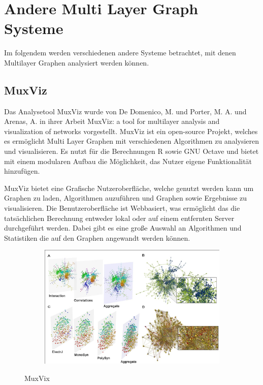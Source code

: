 \section{Andere Multi Layer Graph Systeme}

Im folgendem werden verschiedenen andere Systeme betrachtet, mit denen Multilayer Graphen analysiert werden können.

\subsection{MuxViz}

Das Analysetool MuxViz wurde von De Domenico, M. und Porter, M. A. und Arenas, A. in ihrer Arbeit MuxViz: a tool for multilayer analysis and visualization of networks vorgestellt.
MuxViz ist ein open-source Projekt, welches es ermöglicht Multi Layer Graphen mit verschiedenen Algorithmen zu analysieren und visualisieren. Es nutzt für die Berechnungen R sowie GNU Octave und bietet mit einem modularen Aufbau die Möglichkeit, das Nutzer eigene Funktionalität hinzufügen.


MuxViz bietet eine Grafische Nutzeroberfläche, welche genutzt werden kann um Graphen zu laden, Algorithmen auzuführen und Graphen sowie Ergebnisse zu visualisieren. Die Benutzeroberfläche ist Webbasiert, was ermöglicht das die tatsächlichen Berechnung entweder lokal oder auf einem entfernten Server durchgeführt werden.
Dabei gibt es eine große Auswahl an Algorithmen und Statistiken die auf den Graphen angewandt werden können.


\begin{figure}
  \centering
  \begin{subfigure}[b]{1.0\textwidth}
    \includegraphics[width=1.0\linewidth]{img/muxViz.png}
  \end{subfigure}
  \caption{MuxVix}
  \label{muxVizSample}
\end{figure}

